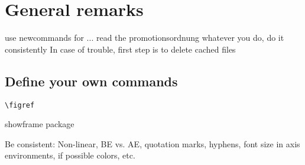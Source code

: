 \chapter{General remarks}\label{cha:remarks}

use newcommands for ...
read the promotionsordnung
whatever you do, do it consistently
In case of trouble, first step is to delete cached files

\section{Define your own commands}
\verb|\figref|


showframe package


Be consistent: Non-linear, BE vs. AE, quotation marks, hyphens, font size in axis environments, if possible colors, etc.